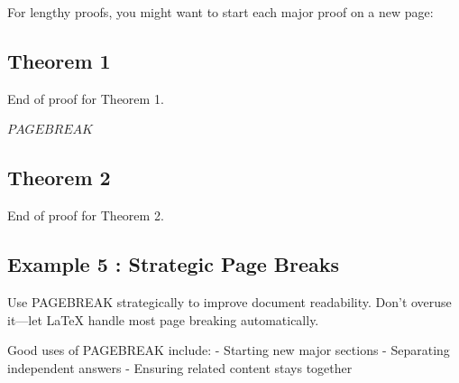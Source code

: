 \documentclass[a4paper,10pt,fleqn]{article}
\begin{document}
\noindent For lengthy proofs, you might want to start each major proof on a new page:

\bigskip

\subsection*{Theorem 1}

\begin{center}
\end{center}
\bigskip

\noindent End of proof for Theorem 1.

\bigskip

\noindent
$PAGEBREAK$


\subsection*{Theorem 2}

\begin{center}
\end{center}
\bigskip

\noindent End of proof for Theorem 2.

\bigskip

\subsection*{Example 5 : Strategic Page Breaks}

\noindent Use PAGEBREAK strategically to improve document readability. Don't overuse it—let LaTeX handle most page breaking automatically.

\bigskip

\noindent Good uses of PAGEBREAK include: - Starting new major sections - Separating independent answers - Ensuring related content stays together
\end{document}
